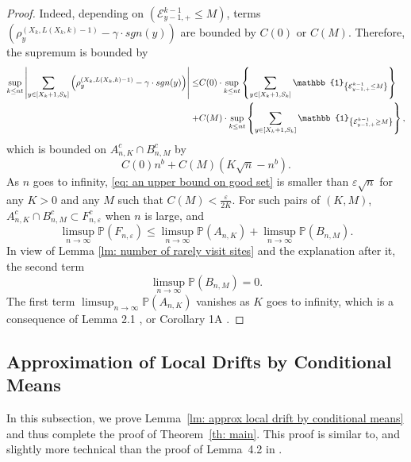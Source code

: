 \documentclass[EJP]{ejpecp} %
\newcommand{\abs}[1]{\left\vert #1 \right\vert}
\begin{document}
\begin{proof}
	Indeed, depending on $(\mathcal{E}^{k-1}_{y-1,+} \leq M)$, terms  $\left( \rho^{(X_k,L(X_k,k)-1)}_y -  \gamma \cdot sgn(y) \right)$ are bounded by $C(0)$ or $C(M)$. Therefore, the supremum is bounded by
	\begin{align*}
		\sup_{k\leq n t}  \abs{  	\sum_{y\in [X_{k}+1 ,S_k]} \left( \rho^{(X_k,L(X_k,k)-1)}_y -  \gamma \cdot sgn(y) \right) } \leq &  
		C(0) \cdot \sup_{k\leq n t} \left\{   	\sum_{y\in [X_{k}+1 ,S_k]} \mathbb{1}_{ \left\{ \mathcal{E}^{k-1}_{y-1,+} \leq M \right\} } \right\}
		\notag
		\\
		+& C(M) \cdot \sup_{k\leq n t} \left\{   	\sum_{y\in [X_{k}+1 ,S_k]} \mathbb{1}_{ \left\{ \mathcal{E}^{k-1}_{y-1,+} \geq M \right\} } \right\},
	\end{align*} which is bounded on $A^c_{n,K} \cap B^c_{n,M}$ by
	\begin{equation}\label{eq: an upper bound on good set}
		C(0)n^b  + C(M) \left(K \sqrt{n} -n^b\right).
	\end{equation} As $n$ goes to infinity, \eqref{eq: an upper bound on good set} is smaller than $\varepsilon \sqrt{n}$ for any $K>0$ and any $M$ such that $C(M) < \frac{\varepsilon}{2K}$. 
	For such pairs of $(K,M)$, $A^c_{n,K} \cap B^c_{n,M} \subset F^c_{n,\varepsilon}$ when $n$ is large,  and 
	$$
	\limsup_{n\to \infty} \mathbb{P}(F_{n,\varepsilon}) \leq \limsup_{n\to \infty}  \mathbb{P}(A_{n,K}) +  \limsup_{n\to \infty}  \mathbb{P}(B_{n,M}).
	$$ In view of Lemma \ref{lm: number of rarely visit sites} and the explanation after it, the second term $$\limsup_{n\to \infty}  \mathbb{P}(B_{n,M})=0.$$  The first term $\limsup_{n\to \infty}  \mathbb{P}(A_{n,K}) $ vanishes as $K$ goes to infinity, which is a consequence of Lemma 2.1 \cite{KMP23}, or Corollary 1A \cite{T96}.
\end{proof}


\subsection{Approximation of Local Drifts by Conditional Means}
\label{sec:DeltaRho}
In this subsection, we prove Lemma~\ref{lm: approx local drift by conditional means} and thus complete the proof of Theorem~\ref{th: main}. This proof is similar to, and slightly more technical than the proof of {Lemma~4.2} in \cite{KP16}. 
\end{document}
